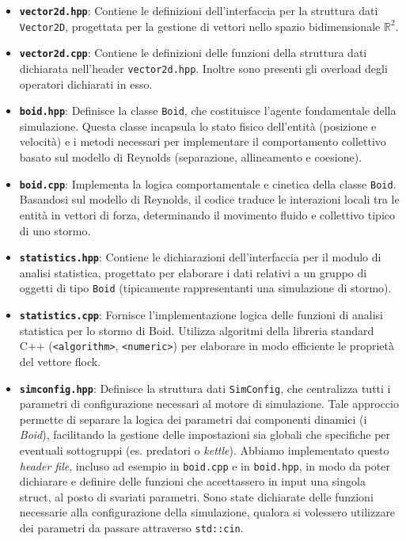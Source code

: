 \documentclass[11pt, a4paper]{article}
\begin{document}
\begin{itemize}
    \item \textbf{\texttt{vector2d.hpp}}: Contiene le definizioni dell'interfaccia per la struttura dati \texttt{Vector2D}, progettata per la gestione di vettori nello spazio bidimensionale $\mathbb{R}^2$.
    \item \textbf{\texttt{vector2d.cpp}}: Contiene le definizioni delle funzioni della struttura dati dichiarata nell'header \texttt{vector2d.hpp}. Inoltre sono presenti gli overload degli operatori dichiarati in esso.
    \item \textbf{\texttt{boid.hpp}}: Definisce la classe \texttt{Boid}, che costituisce l'agente fondamentale della simulazione. Questa classe incapsula lo stato fisico dell'entità (posizione e velocità) e i metodi necessari per implementare il comportamento collettivo basato sul modello di Reynolds (separazione, allineamento e coesione).
    \item \textbf{\texttt{boid.cpp}}: Implementa la logica comportamentale e cinetica della classe \texttt{Boid}. Basandosi sul modello di Reynolds, il codice traduce le interazioni locali tra le entità in vettori di forza, determinando il movimento fluido e collettivo tipico di uno stormo.
    \item \textbf{\texttt{statistics.hpp}}: Contiene le dichiarazioni dell'interfaccia per il modulo di analisi statistica, progettato per elaborare i dati relativi a un gruppo di oggetti di tipo \texttt{Boid} (tipicamente rappresentanti una simulazione di stormo).
    \item \textbf{\texttt{statistics.cpp}}: Fornisce l'implementazione logica delle funzioni di analisi statistica per lo stormo di Boid. Utilizza algoritmi della libreria standard C++ (\texttt{<algorithm>}, \texttt{<numeric>}) per elaborare in modo efficiente le proprietà del vettore flock.
    \item \textbf{\texttt{simconfig.hpp}}: Definisce la struttura dati \texttt{SimConfig}, che centralizza tutti i parametri di configurazione necessari al motore di simulazione. Tale approccio permette di separare la logica dei parametri dai componenti dinamici (i \textit{Boid}), facilitando la gestione delle impostazioni sia globali che specifiche per eventuali sottogruppi (es. predatori o \textit{kettle}). Abbiamo implementato questo \textit{header file}, incluso ad esempio in \texttt{boid.cpp} e in \texttt{boid.hpp}, in modo da poter dichiarare e definire delle funzioni che accettassero in input una singola struct, al posto di svariati parametri. Sono state dichiarate delle funzioni necessarie alla configurazione della simulazione, qualora si volessero utilizzare dei parametri da passare attraverso \texttt{std::cin}.

\end{itemize}
\end{document}
